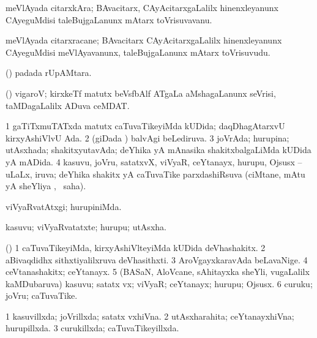 {{{{{{\bentry
{} 
\gl{\nA}
\expl{}
\bmng
 meVlAyada citarxkAra; BAvacitarx, CAyAcitarxgaLalilx hinenxleyanunx CAyeguMdisi taleBujgaLanunx mAtarx toVrisuvavanu. 
\emng
\eentry

\bentry
{} 
\gl{\nA}
\expl{}
\bmng
 meVlAyada citarxracane; BAvacitarx CAyAcitarxgaLalilx hinenxleyanunx CAyeguMdisi meVlAyavanunx, taleBujgaLanunx mAtarx toVrisuvudu. 
\emng
\eentry

\bentry
{} 
\gl{\nA}
\expl{}
\bmng
\emng
\eentry

\bentry
{} 
\gl{\nA}
\expl{}
\bmng
 (\ame)  padada rUpAMtara. 
\emng
\eentry

\bentry
{} 
\gl{\nA}
\expl{}
\bmng
 (\AseTxrXV) vigaroV; kirxkeTf matutx beVsfbAlf ATgaLa aMshagaLanunx seVrisi, taMDagaLalilx ADuva ceMDAT. 
\emng
\eentry

\bentry
{} 
\gl{\gu}
\expl{}
\bmng
\bnum
\num{1} gaTiTxmuTATxda matutx caTuvaTikeyiMda kUDida; daqDhagAtarxvU kirxyAshiVlvU Ada. 
\num{2} (giDada \vi) balvAgi beLediruva. 
\num{3} joVrAda; hurupina; utAsxhada; shakitxyutavAda; deYhika yA mAnasika shakitxbalgaLiMda kUDida yA mADida. 
\num{4} kasuvu, joVru, satatxvX, viVyaR, ceYtanayx, hurupu, Ojsusx -- uLaLx, iruva; deYhika shakitx yA caTuvaTike parxdashiRsuva (ciMtane, mAtu yA sheYliya \vi, \rUpa\ saha). 
\enum
\emng
\eentry

\bentry
{} 
\gl{\kirxvi}
\expl{}
\bmng
 viVyaRvatAtxgi; hurupiniMda. 
\emng
\eentry

\bentry
{} 
\gl{\nA}
\expl{}
\bmng
 kasuvu; viVyaRvatatxte; hurupu; utAsxha. 
\emng
\eentry

\bentry
{} 
\gl{\nA}
\expl{}
\bmng
 (\birx) 
\bnum
\num{1} caTuvaTikeyiMda, kirxyAshiVlteyiMda kUDida deVhashakitx. 
\num{2} aBivaqdidhx sithxtiyalilxruva deVhasithxti. 
\num{3} AroVgayxkaravAda beLavaNige. 
\num{4} ceVtanashakitx; ceYtanayx. 
\num{5} (BASaN, AloVcane, sAhitayxka sheYli, \mo vugaLalilx kaMDubaruva) kasuvu; satatx vx; viVyaR; ceYtanayx; hurupu; Ojsusx. 
\num{6} curuku; joVru; caTuvaTike. 
\enum
\emng
\eentry

\bentry
{} 
\gl{\gu}
\expl{}
\bmng
\bnum
\num{1} kasuvillxda; joVrillxda; satatx vxhiVna. 
\num{2} utAsxharahita; ceYtanayxhiVna; hurupillxda. 
\num{3} curukillxda; caTuvaTikeyillxda. 
\enum
\emng
\eentry

}}}}}}
